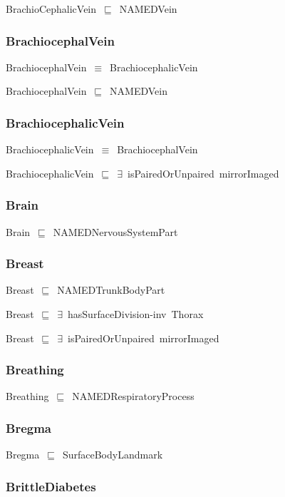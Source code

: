 \documentclass{article}
\begin{document}
BrachioCephalicVein~\ensuremath{\sqsubseteq}~NAMEDVein~

\subsubsection*{BrachiocephalVein}

BrachiocephalVein~\ensuremath{\equiv}~BrachiocephalicVein

BrachiocephalVein~\ensuremath{\sqsubseteq}~NAMEDVein~

\subsubsection*{BrachiocephalicVein}

BrachiocephalicVein~\ensuremath{\equiv}~BrachiocephalVein

BrachiocephalicVein~\ensuremath{\sqsubseteq}~\ensuremath{\exists}~isPairedOrUnpaired~mirrorImaged~

\subsubsection*{Brain}

Brain~\ensuremath{\sqsubseteq}~NAMEDNervousSystemPart~

\subsubsection*{Breast}

Breast~\ensuremath{\sqsubseteq}~NAMEDTrunkBodyPart~

Breast~\ensuremath{\sqsubseteq}~\ensuremath{\exists}~hasSurfaceDivision-inv~Thorax~

Breast~\ensuremath{\sqsubseteq}~\ensuremath{\exists}~isPairedOrUnpaired~mirrorImaged~

\subsubsection*{Breathing}

Breathing~\ensuremath{\sqsubseteq}~NAMEDRespiratoryProcess~

\subsubsection*{Bregma}

Bregma~\ensuremath{\sqsubseteq}~SurfaceBodyLandmark~

\subsubsection*{BrittleDiabetes}
\end{document}
